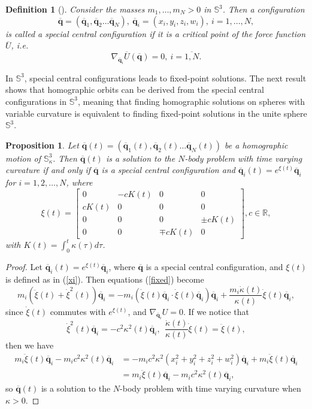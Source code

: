 \documentclass[12pt]{amsart}
\newtheorem{definition}{Definition}
\newtheorem{proposition}{Proposition}
\theoremstyle{definition}
\def \mb{\mathbb}
\def \R{\mb R}                 %
\def \S{\mb S}        %
\newcommand {\q} {\mathbf{q}}
\begin{document}
{\begin{definition}[\cite{DiacuZhu}]
Consider the masses $m_1,\dots, m_N>0$ in $\S^3$. Then
a configuration
$$
\overline{\q}=(\overline{\q}_1, \overline{\q}_2 \ldots \overline{\q}_N),\ \overline{\q}_i=(x_i,y_i,z_i,w_i), \ i=1,...,N,
$$
is called a special central configuration if it is a critical point of the force function $\overline{U}$, i.e.
\begin{equation*}
\nabla_{\overline{\q}_i}\overline{U}(\overline{\q})=0,\ i=\overline{1,N}.
\end{equation*} 
\end{definition}


In $\S^3$, special central configurations leads to fixed-point solutions.
The next result shows that homographic orbits can be derived from the special central configurations in $\S^3$, meaning that finding homographic solutions on spheres with variable curvature is equivalent to finding fixed-point solutions in the unite sphere $\S^3$. 


\begin{proposition}
Let $\overline{\q}(t)=(\overline{\q}_1(t), \overline{\q}_2(t) \ldots \overline{\q}_N(t))$ be a homographic motion of $\mathbb{S}^3_\kappa$. Then $\overline{\q}(t)$ is a solution to the $N$-body problem with time varying curvature if and only if $\overline{\q}$ is a special central configuration and $\overline{\q}_i(t)=e^{\xi(t)}\overline{\q}_i$ for $i=1,2,\ldots, N$, where \begin{equation} \xi(t)=\begin{bmatrix} 0 & -cK(t) & 0 & 0\\ cK(t) & 0 & 0 & 0\\ 0 & 0 & 0 & \pm cK(t)\\ 0 & 0 & \mp cK(t) & 0\end{bmatrix}, c \in \R, \label{xi}\end{equation}
with $K(t)=\int_0^t \kappa(\tau)d\tau$.
\end{proposition}
\begin{proof}
Let $\overline{\q}_i(t)=e^{\xi(t)}\overline{\q}_i$, where $\overline{\q}$ is a special central configuration, and $\xi(t)$ is defined as in (\ref{xi}). Then equations (\ref{fixed}) become 
\begin{equation*}
m_i(\ddot{\xi}(t)+\dot{\xi}^2(t))\overline{\q}_i=-m_i(\dot{\xi}(t)\overline{\q}_i \cdot \dot{\xi}(t)\overline{\q}_i)\overline{\q}_i+\frac{m_i\dot{\kappa}(t)}{\kappa(t)}\dot{\xi}(t)\overline{\q}_i,
\end{equation*}
since $\dot{\xi}(t)$ commutes with $e^{\xi(t)}$, and $\nabla_{\overline{\q}_i} U=0$. If we notice that 
$$
\dot{\xi}^2(t)\overline{\q}_i=-c^2\kappa^2(t)\overline{\q}_i,
\ \ \frac{\dot{\kappa}(t)}{\kappa(t)}\dot{\xi}(t)=\ddot{\xi}(t),
$$ 
then we have 
\begin{align*}
m_i\ddot{\xi}(t)\overline{\q}_i-m_ic^2\kappa^2(t)\overline{\q}_i&=-m_ic^2\kappa^2(x_i^2+y_i^2+z_i^2+w_i^2)\overline{\q}_i+m_i\ddot{\xi}(t)\overline{\q}_i\\
&=m_i\ddot{\xi}(t)\overline{\q}_i-m_ic^2\kappa^2(t)\overline{\q}_i,\end{align*}
so $\overline{\q}(t)$ is a solution to the $N$-body problem with time varying curvature when $\kappa >0$.
\smallskip


\end{proof}}
\end{document}
